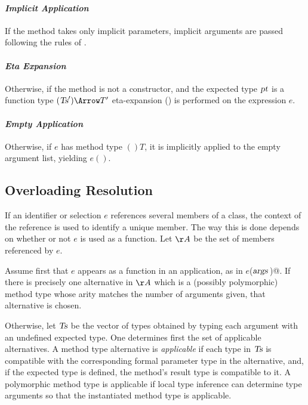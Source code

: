 \paragraph{\em Implicit Application}
  If the method takes only implicit parameters, implicit
  arguments are passed following the rules of .

\paragraph{\em Eta Expansion}
  Otherwise, if the method is not a constructor, 
  and the expected type $\mbox{\sl pt}$ is a function type
  $(\Ts') \Arrow T'$ eta-expansion
  () is performed on the
  expression $e$.

\paragraph{\em Empty Application}
  Otherwise, if $e$ has method type $()T$, it is implicitly applied to the empty
  argument list, yielding $e()$.

\subsection{Overloading Resolution}
\label{sec:overloading-resolution}

If an identifier or selection $e$ references several members of a
class, the context of the reference is used to identify a unique
member.  The way this is done depends on whether or not $e$ is used as
a function.  Let $\AA$ be the set of members referenced by $e$.

Assume first that $e$ appears as a function in an application, as
in \lstinline@$e$($\mbox{\sl args}\,$)@.  If there is precisely one alternative in
$\AA$ which is a (possibly polymorphic) method type whose arity
matches the number of arguments given, that alternative is chosen.

Otherwise, let $\mbox{\sl Ts}$ be the vector of types obtained by
typing each argument with an undefined expected type. One determines
first the set of applicable alternatives. A method type alternative is
{\em applicable} if each type in $\mbox{\sl Ts}$ is compatible with
the corresponding formal parameter type in the alternative, and, if 
the expected type is defined, the method's result type is compatible to
it.  A polymorphic method type is applicable if local type inference
can determine type arguments so that the instantiated method type is
applicable.

